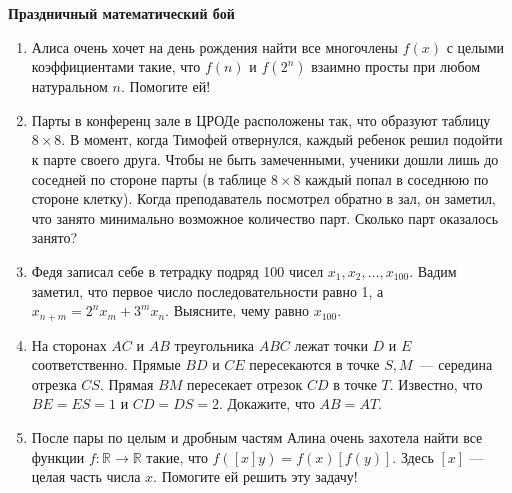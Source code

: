 \documentclass{article}
\begin{document}
    \large

    \begin{center}
        \textbf{Праздничный математический бой}
    \end{center}

    \begin{enumerate}[label*=\arabic{enumi}.]

        \item Алиса очень хочет на день рождения найти все многочлены $f(x)$ с целыми коэффициентами такие, что $f(n)$ и $f(2^n)$ взаимно просты при любом натуральном $n$.
        Помогите ей!

        \item Парты в конференц зале в ЦРОДе расположены так, что образуют таблицу $8 \times 8$.
        В момент, когда Тимофей отвернулся, каждый ребенок решил подойти к парте своего друга.
        Чтобы не быть замеченными, ученики дошли лишь до соседней по стороне парты (в таблице $8 \times 8$ каждый попал в соседнюю по стороне клетку).
        Когда преподаватель посмотрел обратно в зал, он заметил, что занято минимально возможное количество парт.
        Сколько парт оказалось занято?


        \item Федя записал себе в тетрадку подряд 100 чисел $x_1, x_2, \dots, x_{100}$.
        Вадим заметил, что первое число последовательности равно 1, а $x_{n+m} = 2^{n}x_m+3^{m}x_n$.
        Выясните, чему равно $x_{100}$.

        \item На сторонах $AC$ и $AB$ треугольника $ABC$ лежат точки $D$ и $E$ соответственно.
        Прямые $BD$ и $CE$ пересекаются в точке $S, M$~--- середина отрезка $CS$.
        Прямая $BM$ пересекает отрезок $CD$ в точке $T$.
        Известно, что $BE = ES = 1$ и $CD = DS = 2$.
        Докажите, что $AB = AT$.

        \item После пары по целым и дробным частям Алина очень захотела найти все функции $f: \mathbb{R} \rightarrow \mathbb{R}$ такие, что $f([x]y) = f(x)[f(y)]$.
        Здесь $[x]$ — целая часть числа $x$.
        Помогите ей решить эту задачу!




\end{enumerate}
\end{document}
